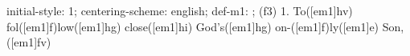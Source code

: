initial-style: 1;
centering-scheme: english;
def-m1: \grealign;
(f3) 1. To([em1]hv) fol([em1]f)low([em1]hg) close([em1]hi) God's([em1]hg) on-([em1]f)ly([em1]e) Son,([em1]fv)
